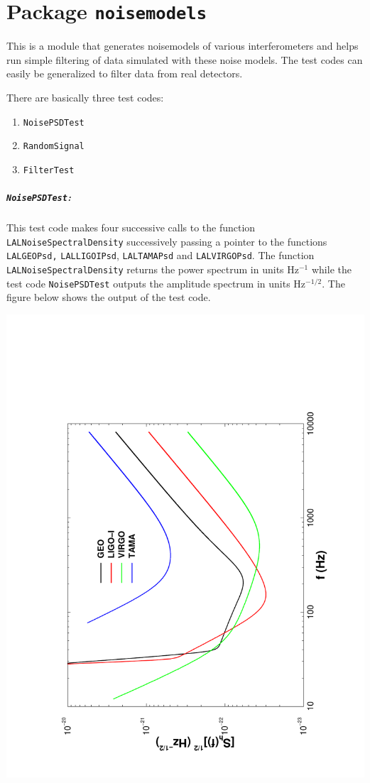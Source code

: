 \chapter{Package \texttt{noisemodels}}

This is a module that generates noisemodels of various interferometers
and helps run simple filtering of data simulated with these noise models.
The test codes can easily be generalized to filter data from real
detectors.

There are basically three test codes:
\begin{enumerate} 
\item \texttt{NoisePSDTest}
\item \texttt{RandomSignal}
\item \texttt{FilterTest}
\end{enumerate} 

\paragraph* {\texttt{NoisePSDTest}:} This test code makes four
successive calls to the function \texttt{LALNoiseSpectralDensity}
successively passing a pointer to the functions \texttt{LALGEOPsd,} 
\texttt{LALLIGOIPsd}, \texttt{LALTAMAPsd} and \texttt {LALVIRGOPsd}.  
The function \texttt{LALNoiseSpectralDensity} returns the power
spectrum in units Hz$^{-1}$ while the test code \texttt{NoisePSDTest}
outputs the amplitude spectrum in units Hz$^{-1/2}.$ The figure
below shows the output of the test  code.
\begin{center}
\includegraphics[angle=-90,width=4truein]{NoisePSDTest.pdf}
\end{center}
 
